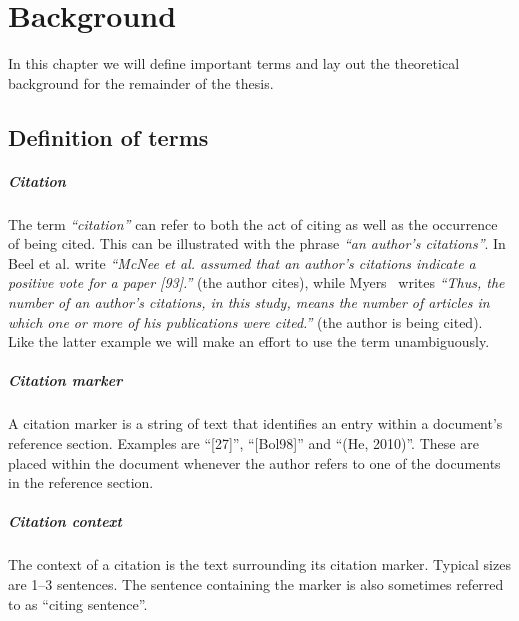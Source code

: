 \chapter{Background}\label{chap:background}
In this chapter we will define important terms and lay out the theoretical background for the remainder of the thesis.

\section{Definition of terms}
\paragraph{Citation} The term \emph{``citation''} can refer to both the act of citing as well as the occurrence of being cited. This can be illustrated with the phrase \emph{``an author's citations''}. In \cite{Beel2016} Beel et al. write \emph{``McNee et al. assumed that an author's citations indicate a positive vote for a paper [93].''} (the author cites), while Myers~\cite{Myers1970} writes \emph{``Thus, the number of an author's citations, in this study, means the number of articles in which one or more of his publications were cited.''} (the author is being cited). Like the latter example we will make an effort to use the term unambiguously.
\paragraph{Citation marker} A citation marker is a string of text that identifies an entry within a document's reference section. Examples are ``[27]'', ``[Bol98]'' and ``(He, 2010)''. These are placed within the document whenever the author refers to one of the documents in the reference section.
\paragraph{Citation context} The context of a citation is the text surrounding its citation marker. Typical sizes are 1--3 sentences. The sentence containing the marker is also sometimes referred to as ``citing sentence''. 


